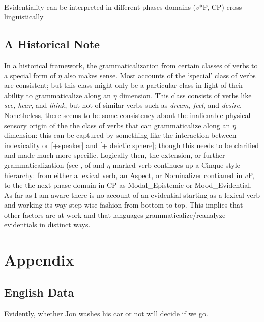 \documentclass{article}
\begin{document}
\begin{exe}
\\
Evidentiality can be interpreted in different phases domains ($v$*P, CP) cross-linguistically
\end{exe}

\subsection{A Historical Note}
In a historical framework, the grammaticalization from certain classes of verbs to a special form of $\eta$ also makes sense. Most accounts of the `special' class of verbs are consistent; but this class might only be a particular class in light of their ability to grammaticalize along an $\eta$ dimension. This class consists of verbs like {\sl see, hear}, and {\sl think}, but not of similar verbs such as {\sl dream, feel}, and {\sl desire}. Nonetheless, there seems to be some consistency about the inalienable physical sensory origin of the the class of verbs that can grammaticalize along an $\eta$ dimension: this can be captured by something like the interaction between indexicality or [+speaker] and [+ deictic sphere]; though this needs to be clarified and made much more specific. Logically then, the extension, or further grammaticalization (see \cite{harriscampbell95syntax}, of and $\eta$-marked verb continues up a Cinque-style hierarchy: from either a lexical verb, an Aspect, or Nominalizer contianed in $v$P, to the the next phase domain in CP as Modal_{Epistemic} or Mood_{Evidential}. As far as I am aware there is no account of an evidential starting as a lexical verb and working its way step-wise fashion from bottom to top. This implies that other factors are at work and that languages grammaticalize/reanalyze evidentials in distinct ways.     



\section{Appendix}\label{appendix}
\subsection{English Data}

\begin{exe}

\ex Evidently, whether Jon washes his car or not will decide if we go.
\begin{xlist}
\end{xlist}
\end{exe}
\end{document}

